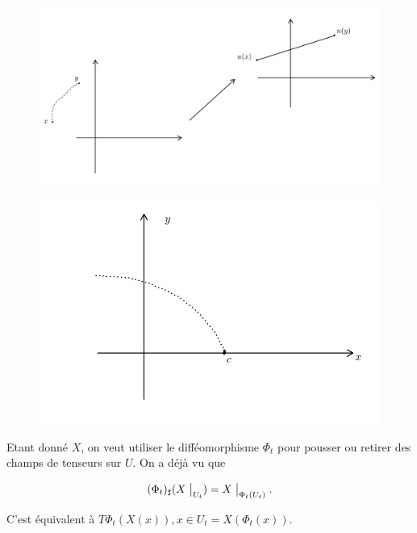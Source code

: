 \documentclass[french]{article}
\theoremstyle{definition}
\begin{document}

\begin{figure}[h!]
  \centering
  \includegraphics[scale=0.3]{figures/fig10.png}
  \caption{}
  \label{}
\end{figure}


\begin{figure}[h!]
  \centering
  \includegraphics[scale=0.3]{figures/fig11.png}
  \caption{}
  \label{}
\end{figure}


Etant donné \(X\), on veut utiliser le difféomorphisme \(\Phi_t\) pour pousser ou retirer des champs de tenseurs sur \(U\). On a déjà vu que

\begin{equation}\label{cond_ch_tens}
  (\Phi_t)_{\sharp}(X \bigm|_{U_t}) = X \bigm|_{\Phi_t(U_t)}.
\end{equation}

C'est équivalent à \(T \Phi_t(X(x)), x \in U_t = X(\Phi_t(x)).\)
\end{document}
